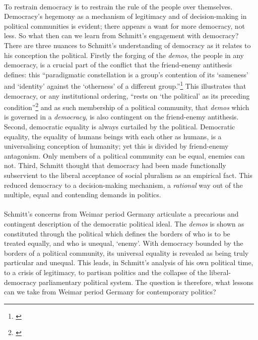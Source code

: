 \documentclass[12pt,a4paper,titlepage]{article}
\begin{document}
\paragraph{}To restrain democracy is to restrain the rule of the people over themselves. Democracy's hegemony as a mechanism of legitimacy and of decision-making in political communities is evident; there appears a want for more democracy, not less.  So what then can we learn from Schmitt's engagement with democracy? There are three nuances to Schmitt's understanding of democracy as it relates to his conception the political. Firstly the forging of the \emph{demos}, the people in any democracy, is a crucial part of the conflict that the friend-enemy antithesis defines: this ``paradigmatic constellation is a group's contention of its `sameness' and `identity' against the `otherness' of a different group.''\footnote{\cite[p.156]{Preuss:1999cs}} This illustrates that democracy, or any institutional ordering, ``rests on `the political' as its preceding condition''\footnote{\cite[p.157]{Preuss:1999cs}} and as such membership of a political community, that \emph{demos} which is governed in a \emph{democracy}, is also contingent on the friend-enemy antithesis. Second, democratic equality is always curtailed by the political. Democratic equality, the equality of humans beings with each other as humans, is a universalising conception of humanity; yet this is divided by friend-enemy antagonism. Only members of a political community can be equal, enemies can not. Third, Schmitt thought that democracy had been made functionally subservient to the liberal acceptance of social pluralism as an empirical fact. This reduced democracy to a decision-making mechanism, a \emph{rational} way out of the multiple, equal and contending demands in politics.

\paragraph{}Schmitt's concerns from Weimar period Germany articulate a precarious and contingent description of the democratic political ideal. The \emph{demos} is shown as constituted through the political which defines the borders of who is to be treated equally, and who is unequal, `enemy'. With democracy bounded by the borders of a political community, its universal equality is revealed as being truly particular and unequal. This leads, in Schmitt's analysis of his own political time, to a crisis of legitimacy, to partisan politics and the collapse of the liberal-democracy parliamentary political system. The question is therefore, what lessons can we take from Weimar period Germany for contemporary politics?
\end{document}
